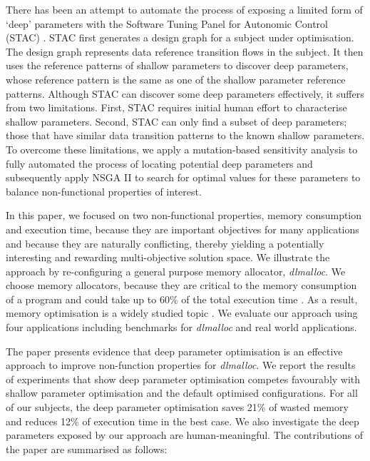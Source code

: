 There has been an attempt to automate the process of exposing a limited form of `deep' parameters with the Software Tuning Panel for Autonomic Control (STAC) \cite{Brake:2008:ADS:1370018.1370031}. STAC first generates a design graph for a subject under optimisation. The design graph represents data reference transition flows in the subject. It then uses the reference patterns of shallow parameters to discover deep parameters, whose reference pattern is the same as one of the shallow parameter reference patterns. Although STAC can discover some deep parameters effectively, it suffers from two limitations. First, STAC requires initial human effort to characterise shallow parameters. Second, STAC can only find a subset of deep parameters; those that have similar data transition patterns to the known shallow parameters. To overcome these limitations, we apply a mutation-based sensitivity analysis to fully automated the process of locating potential deep parameters and subsequently apply NSGA II to search for optimal values for these parameters to balance non-functional properties of interest. 

In this paper, we focused on two non-functional properties, memory consumption and execution time, because they are important objectives for many applications and because they are naturally conflicting, thereby yielding a potentially interesting and rewarding multi-objective solution space. We illustrate the approach by re-configuring a general purpose memory allocator, \emph{dlmalloc}. We choose memory allocators, because they are critical to the memory consumption of a program and could take up to 60\% of the total execution time \cite{Zorn:1992:EMS:142181.142200}. As a result, memory optimisation is a widely studied topic \cite{Risco-Martin:2009:ODM:1569901.1570116,RiscoMartin2010572}. We evaluate our approach using four applications including benchmarks for \emph{dlmalloc} and real world applications.

The paper presents evidence that deep parameter optimisation is an effective approach to improve non-function properties for \emph{dlmalloc}. 
We report the results of experiments that show deep parameter optimisation competes favourably with shallow parameter optimisation and the default optimised configurations. For all of our subjects, the deep parameter optimisation saves 21\% of wasted memory and reduces 12\% of execution time in the best case. We also investigate the deep parameters exposed by our approach are human-meaningful. The contributions of the paper are summarised as follows:


